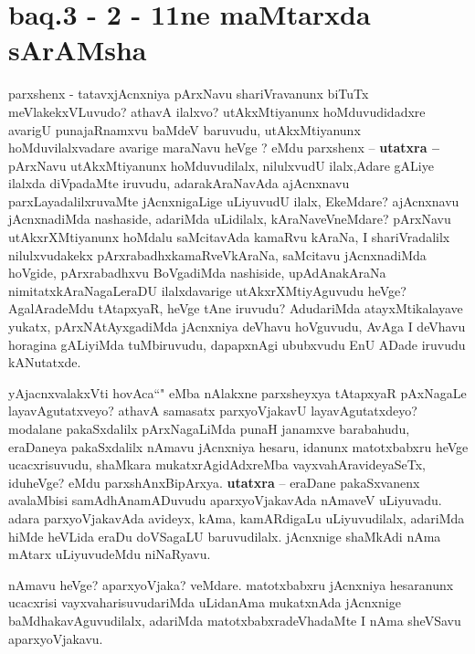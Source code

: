 \section*{baq.3 - 2 - 11ne maMtarxda sArAMsha}

\begin{artha}
parxshenx - tatavxjAcnxniya pArxNavu shariVravanunx biTuTx meVlakekxVLuvudo? athavA ilalxvo? utAkxMtiyanunx hoMduvudidadxre avarigU punajaRnamxvu baMdeV baruvudu, utAkxMtiyanunx hoMduvilalxvadare avarige maraNavu heVge ? eMdu parxshenx --
\textbf{utatxra --} pArxNavu utAkxMtiyanunx hoMduvudilalx, nilulxvudU ilalx,Adare gALiye ilalxda diVpadaMte iruvudu, adarakAraNavAda ajAcnxnavu parxLayadalilxruvaMte jAcnxnigaLige uLiyuvudU ilalx, EkeMdare? ajAcnxnavu jAcnxnadiMda nashaside, adariMda uLidilalx, kAraNaveVneMdare? pArxNavu utAkxrXMtiyanunx hoMdalu saMcitavAda kamaRvu kAraNa, I shariVradalilx nilulxvudakekx pArxrabadhxkamaRveVkAraNa, saMcitavu jAcnxnadiMda hoVgide, pArxrabadhxvu BoVgadiMda nashiside, upAdAnakAraNa nimitatxkAraNagaLeraDU ilalxdavarige utAkxrXMtiyAguvudu heVge? AgalAradeMdu tAtapxyaR, heVge tAne iruvudu? AdudariMda atayxMtikalayave yukatx, pArxNAtAyxgadiMda jAcnxniya deVhavu hoVguvudu, AvAga I deVhavu horagina gALiyiMda tuMbiruvudu, dapapxnAgi ububxvudu EnU ADade iruvudu kANutatxde.
\end{artha}

\begin{artha}
yAjacnxvalakxVti hovAca``\stext" eMba nAlakxne parxsheyxya tAtapxyaR pAxNagaLe 
layavAgutatxveyo? athavA samasatx parxyoVjakavU layavAgutatxdeyo? modalane pakaSxdalilx 
pArxNagaLiMda punaH janamxve barabahudu, eraDaneya pakaSxdalilx nAmavu jAcnxniya hesaru, 
idanunx matotxbabxru heVge ucacxrisuvudu, shaMkara mukatxrAgidAdxreMba 
vayxvahAravideyaSeTx, iduheVge? eMdu parxshAnxBipArxya.
\textbf{utatxra} -- eraDane pakaSxvanenx avalaMbisi samAdhAnamADuvudu aparxyoVjakavAda nAmaveV uLiyuvadu. adara parxyoVjakavAda avideyx, kAma, kamARdigaLu uLiyuvudilalx, adariMda hiMde heVLida eraDu doVSagaLU baruvudilalx. jAcnxnige shaMkAdi nAma mAtarx  uLiyuvudeMdu niNaRyavu.

nAmavu heVge? aparxyoVjaka? veMdare. matotxbabxru jAcnxniya hesaranunx ucacxrisi vayxvaharisuvudariMda uLidanAma mukatxnAda jAcnxnige baMdhakavAguvudilalx, adariMda matotxbabxradeVhadaMte I nAma sheVSavu aparxyoVjakavu.
\end{artha}

\begin{center}
\end{center}

